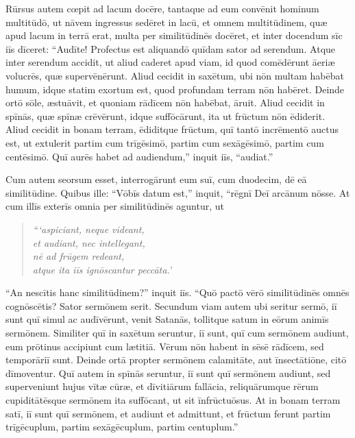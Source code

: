 \Caput
\Versus Rūrsus autem cœpit ad lacum docēre, tantaque ad eum convēnit hominum multitūdō, ut nāvem ingressus sedēret in lacū, et omnem multitūdinem, quæ apud lacum in terrā erat,
\Versus multa per similitūdinēs docēret, et inter docendum sīc iīs dīceret:
\Versus ``Audīte! Profectus est aliquandō quīdam sator ad serendum.
\Versus Atque inter serendum accidit, ut aliud caderet apud viam, id quod comēdērunt āeriæ volucrēs, quæ supervēnērunt.
\Versus Aliud cecidit in saxētum, ubi nōn multam habēbat humum, idque statim exortum est, quod profundam terram nōn habēret.
\Versus Deinde ortō sōle, æstuāvit, et quoniam rādīcem nōn habēbat, āruit.
\Versus Aliud cecidit in spīnās, quæ spīnæ crēvērunt, idque suffōcārunt, ita ut frūctum nōn ēdiderit.
\Versus Aliud cecidit in bonam terram, ēdiditque frūctum, quī tantō incrēmentō auctus est, ut extulerit partim cum trīgēsimō, partim cum sexāgēsimō, partim cum centēsimō.
\Versus Quī aurēs habet ad audiendum,'' inquit iīs, ``audiat.''

\Versus Cum autem seorsum esset, interrogārunt eum suī, cum duodecim, dē eā similitūdine.
\Versus Quibus ille: ``Vōbīs datum est,'' inquit, ``rēgnī Deī arcānum nōsse. At cum illīs exterīs omnia per similitūdinēs aguntur,
\Versus ut 

\begin{verse}
\begin{patverse*}
\emph{```aspiciant, neque videant,\\
et audiant, nec intellegant,\\
nē ad frūgem redeant,\\
atque ita iīs ignōscantur peccāta.'}
\end{patverse*}
\end{verse}

\Versus ``An nescītis hanc similitūdinem?'' inquit iīs. ``Quō pactō vērō similitūdinēs omnēs cognōscētis?
\Versus Sator sermōnem serit.
\Versus Secundum viam autem ubi seritur sermō, iī sunt quī simul ac audīvērunt, venit Satanās, tollitque satum in eōrum animīs sermōnem.
\Versus Similiter quī in saxētum seruntur, iī sunt, quī cum sermōnem audiunt, eum prōtinus accipiunt cum lætitiā.
\Versus Vērum nōn habent in sēsē rādīcem, sed temporāriī sunt. Deinde ortā propter sermōnem calamitāte, aut īnsectātiōne, citō dīmoventur.
\Versus Quī autem in spīnās seruntur, iī sunt quī sermōnem audiunt,
\Versus sed superveniunt hujus vītæ cūræ, et dīvitiārum fallācia, reliquārumque rērum cupiditātēsque sermōnem ita suffōcant, ut sit īnfrūctuōsus.
\Versus At in bonam terram satī, iī sunt quī sermōnem, et audiunt et admittunt, et frūctum ferunt partim trīgēcuplum, partim sexāgēcuplum, partim centuplum.''

